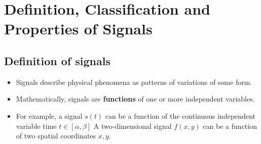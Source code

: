 \section{Definition, Classification and Properties of Signals}
\subsection{Definition of signals}
 \begin{itemize}
    \item  Signals describe physical phenomena as patterns of variations of some form.
    
    \item Mathematically, signals are \textbf{functions} of one or more independent variables.
    
    \item For example, a signal $s(t)$ can be a function of the continuous independent variable time $t \in [\alpha, \beta]$ A two-dimensional signal $f(x, y)$ can be a function of two spatial coordinates $x, y$.
 \end{itemize}


